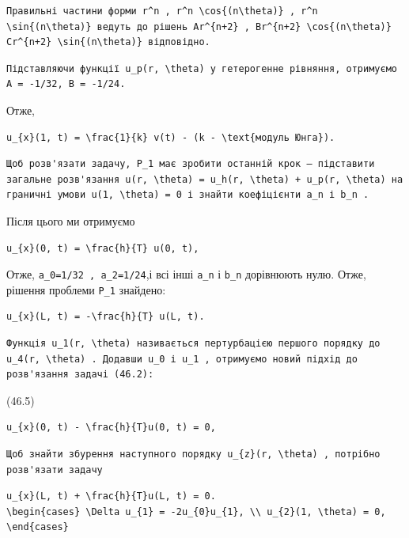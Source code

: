 \documentclass[
  ukrainian,
]{article}
\begin{document}
\begin{verbatim}
Правильні частини форми r^n , r^n \cos{(n\theta)} , r^n \sin{(n\theta)} ведуть до рішень Ar^{n+2} , Br^{n+2} \cos{(n\theta)} Cr^{n+2} \sin{(n\theta)} відповідно.
\end{verbatim}

\begin{verbatim}
Підставляючи функції u_p(r, \theta) у гетерогенне рівняння, отримуємо A = -1/32, B = -1/24.
\end{verbatim}

Отже,

\begin{verbatim}
u_{x}(1, t) = \frac{1}{k} v(t) - (k - \text{модуль Юнга}).
\end{verbatim}

\begin{verbatim}
Щоб розв'язати задачу, P_1 має зробити останній крок — підставити загальне розв'язання u(r, \theta) = u_h(r, \theta) + u_p(r, \theta) на граничні умови u(1, \theta) = 0 і знайти коефіцієнти a_n і b_n .
\end{verbatim}

Після цього ми отримуємо

\begin{verbatim}
u_{x}(0, t) = \frac{h}{T} u(0, t),
\end{verbatim}

Отже, \texttt{a\_0=1/32\ ,\ a\_2=1/24},і всі інші \texttt{a\_n} і
\texttt{b\_n} дорівнюють нулю. Отже, рішення проблеми \texttt{P\_1}
знайдено:

\begin{verbatim}
u_{x}(L, t) = -\frac{h}{T} u(L, t).
\end{verbatim}

\begin{verbatim}
Функція u_1(r, \theta) називається пертурбацією першого порядку до u_4(r, \theta) . Додавши u_0 і u_1 , отримуємо новий підхід до розв'язання задачі (46.2):
\end{verbatim}

(46.5)

\begin{verbatim}
u_{x}(0, t) - \frac{h}{T}u(0, t) = 0,
\end{verbatim}

\begin{verbatim}
Щоб знайти збурення наступного порядку u_{z}(r, \theta) , потрібно розв'язати задачу
\end{verbatim}

\begin{verbatim}
u_{x}(L, t) + \frac{h}{T}u(L, t) = 0.
\begin{cases} \Delta u_{1} = -2u_{0}u_{1}, \\ u_{2}(1, \theta) = 0, \end{cases}
\end{verbatim}
\end{document}
